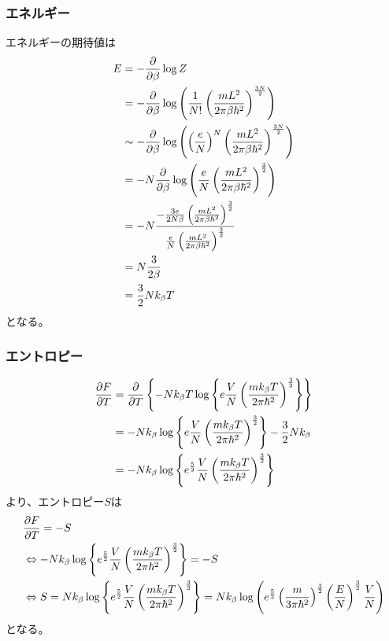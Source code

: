 \documentclass{jsarticle}  %
\numberwithin{equation}{section} %
\numberwithin{figure}{section}
\begin{document}
\subsubsection{エネルギー}
    エネルギーの期待値は
    \begin{align}
        E &= -\frac{\partial }{\partial \beta} \log Z \notag \\
        &= -\frac{\partial }{\partial \beta} \log \left( \frac{1}{N!} \left( \frac{mL^2}{2\pi \beta \hbar^2 } \right)^{\frac{3N}{2}} \right) \notag \\
        &\sim -\frac{\partial }{\partial \beta} \log \left( \left( \frac{e}{N} \right)^N \left( \frac{mL^2}{2\pi \beta \hbar^2 } \right)^{\frac{3N}{2}} \right) \notag \\
        &= -N\frac{\partial }{\partial \beta} \log \left( \frac{e}{N} \left( \frac{mL^2}{2\pi \beta \hbar^2 } \right)^{\frac{3}{2}} \right) \notag \\
        &= -N \frac{-\frac{3e}{2N \beta} \left( \frac{mL^2}{2\pi \beta \hbar^2 } \right)^{\frac{3}{2}}}{\frac{e}{N} \left( \frac{mL^2}{2\pi \beta \hbar^2 } \right)^{\frac{3}{2}}} \notag \\
        &= N \frac{3}{2 \beta} \notag \\
        &= \frac{3}{2} Nk_\beta T
    \end{align}
    となる。
\subsubsection{エントロピー}
    \begin{align}
        \frac{\partial F}{\partial T} &= \frac{\partial }{\partial T} \left\{ -Nk_\beta T \log \left\{ e\frac{V}{N} \left( \frac{mk_\beta T}{2\pi \hbar^2 } \right)^{\frac{3}{2}} \right\} \right\} \notag \\
        &= -Nk_\beta \log \left\{ e\frac{V}{N} \left( \frac{mk_\beta T}{2\pi \hbar^2 } \right)^{\frac{3}{2}} \right\} -\frac{3}{2}Nk_\beta \notag \\
        &= -Nk_\beta \log \left\{ e^\frac{5}{2}\frac{V}{N} \left( \frac{mk_\beta T}{2\pi \hbar^2 } \right)^{\frac{3}{2}} \right\} 
    \end{align}
    より、エントロピー$S$は
    \begin{align}
        &\frac{\partial F}{\partial T} = -S \notag \\
        &\Leftrightarrow -Nk_\beta \log \left\{ e^\frac{5}{2}\frac{V}{N} \left( \frac{mk_\beta T}{2\pi \hbar^2 } \right)^{\frac{3}{2}} \right\} = -S \notag \\
        &\Leftrightarrow S = Nk_\beta \log \left\{ e^\frac{5}{2}\frac{V}{N} \left( \frac{mk_\beta T}{2\pi \hbar^2 } \right)^{\frac{3}{2}} \right\} = Nk_\beta \log \left( e^{\frac{5}{2}} \left(\frac{m}{3 \pi \hbar^2} \right)^{\frac{3}{2}} \left( \frac{E}{N} \right)^{\frac{3}{2}} \frac{V}{N} \right)
    \end{align}
    となる。
\end{document}

